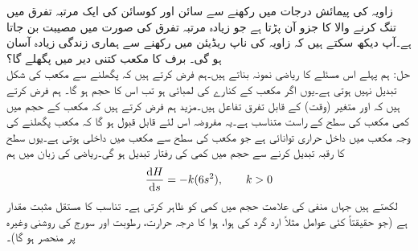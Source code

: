 زاویہ کی پیمائش درجات میں رکھنے سے سائن اور کوسائن کی ایک مرتبہ تفرق میں تنگ کرنے والا  کا جزو آن پڑتا ہے جو زیادہ مرتبہ تفرق کی صورت میں مصیبت بن  جاتا ہے۔آپ دیکھ سکتے ہیں کہ زاویہ کی ناپ ریڈیئن میں رکھنے سے ہماری زندگی زیادہ آسان ہو گی۔
برف کا مکعب کتنی دیر میں پگھلے گا؟\\
حل:\quad
ہم پہلے اس مسئلے کا ریاضی نمونہ بناتے ہیں۔ہم فرض کرتے ہیں کہ پگھلنے سے مکعب کی شکل تبدیل نہیں ہوتی ہے۔یوں اگر مکعب کے کنارے کی لمبائی  ہو تب اس کا حجم  ہو گا۔ ہم فرض کرتے ہیں کہ  اور  متغیر  (وقت) کے قابل تفرق تفاعل ہیں۔مزید ہم فرض کرتے ہیں کہ مکعب کے حجم میں کمی  مکعب کی سطح کے راست متناسب ہے۔یہ مفروضہ اس لئے قابل قبول ہو گا کہ مکعب پگھلنے کی وجہ مکعب میں داخل حراری توانائی ہے جو مکعب کی سطح سے مکعب میں داخلی ہوتی ہے۔یوں سطح کا رقبہ تبدیل کرنے سے حجم میں کمی کی رفتار تبدیل ہو گی۔ریاضی کی زبان میں ہم
\begin{align*}
\frac{\dif H}{\dif s}=-k(6s^2),\quad\quad k>0
\end{align*}
لکھتے ہیں جہاں منفی کی علامت حجم میں کمی کو ظاہر کرتی ہے۔ تناسب کا مستقل  مثبت مقدار ہے (جو حقیقتاً کئی عوامل مثلاً ارد گرد کی ہوا، ہوا کا درجہ حرارت، رطوبت اور سورج کی روشنی وغیرہ پر منحصر ہو گا)۔

